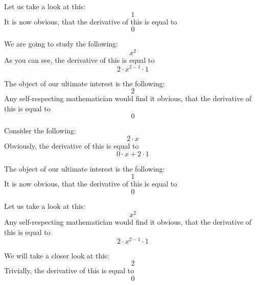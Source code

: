 \documentclass{article}
\begin{document}
Let us take a look at this:
\begin{equation}
1 
\end{equation}
It is now obvious, that the derivative of this is equal to
\begin{equation}
0 
\end{equation}

We are going to study the following:
\begin{equation}
x ^{2 } 
\end{equation}
As you can see, the derivative of this is equal to
\begin{equation}
2 \cdot x ^{2 - 1 } \cdot 1 
\end{equation}

The object of our ultimate interest is the following:
\begin{equation}
2 
\end{equation}
Any self-respecting mathematician would find it obvious, that the derivative of this is equal to
\begin{equation}
0 
\end{equation}

Consider the following:
\begin{equation}
2 \cdot x 
\end{equation}
Obviously, the derivative of this is equal to
\begin{equation}
0 \cdot x + 2 \cdot 1 
\end{equation}

The object of our ultimate interest is the following:
\begin{equation}
1 
\end{equation}
It is now obvious, that the derivative of this is equal to
\begin{equation}
0 
\end{equation}

Let us take a look at this:
\begin{equation}
x ^{2 } 
\end{equation}
Any self-respecting mathematician would find it obvious, that the derivative of this is equal to
\begin{equation}
2 \cdot x ^{2 - 1 } \cdot 1 
\end{equation}

We will take a closer look at this:
\begin{equation}
2 
\end{equation}
Trivially, the derivative of this is equal to
\begin{equation}
0 
\end{equation}
\end{document}
